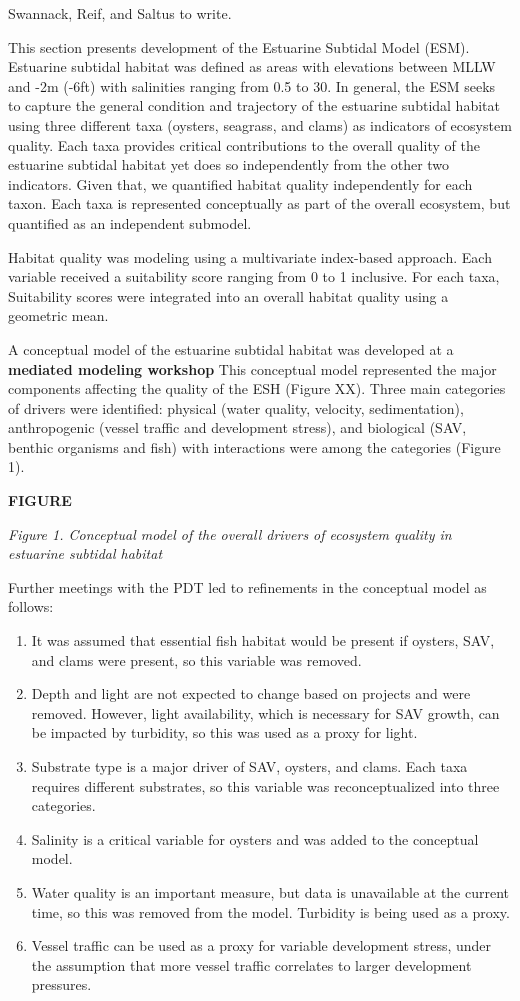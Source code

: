 \documentclass[
]{book}
\begin{document}
{Swannack, Reif, and Saltus to write.}

This section presents development of the Estuarine Subtidal Model (ESM). Estuarine subtidal habitat was defined as areas with elevations between MLLW and -2m (-6ft) with salinities ranging from 0.5 to 30. In general, the ESM seeks to capture the general condition and trajectory of the estuarine subtidal habitat using three different taxa (oysters, seagrass, and clams) as indicators of ecosystem quality. Each taxa provides critical contributions to the overall quality of the estuarine subtidal habitat yet does so independently from the other two indicators. Given that, we quantified habitat quality independently for each taxon. Each taxa is represented conceptually as part of the overall ecosystem, but quantified as an independent submodel.

Habitat quality was modeling using a multivariate index-based approach. Each variable received a suitability score ranging from 0 to 1 inclusive. For each taxa, Suitability scores were integrated into an overall habitat quality using a geometric mean.

A conceptual model of the estuarine subtidal habitat was developed at a \textbf{mediated modeling workshop} This conceptual model represented the major components affecting the quality of the ESH (Figure XX). Three main categories of drivers were identified: physical (water quality, velocity, sedimentation), anthropogenic (vessel traffic and development stress), and biological (SAV, benthic organisms and fish) with interactions were among the categories (Figure 1).

\textbf{FIGURE}

\emph{Figure 1. Conceptual model of the overall drivers of ecosystem quality in estuarine subtidal habitat}

Further meetings with the PDT led to refinements in the conceptual model as follows:

\begin{enumerate}
\def\labelenumi{\arabic{enumi}.}
\item
  It was assumed that essential fish habitat would be present if oysters, SAV, and clams were present, so this variable was removed.
\item
  Depth and light are not expected to change based on projects and were removed. However, light availability, which is necessary for SAV growth, can be impacted by turbidity, so this was used as a proxy for light.
\item
  Substrate type is a major driver of SAV, oysters, and clams. Each taxa requires different substrates, so this variable was reconceptualized into three categories.
\item
  Salinity is a critical variable for oysters and was added to the conceptual model.
\item
  Water quality is an important measure, but data is unavailable at the current time, so this was removed from the model. Turbidity is being used as a proxy.
\item
  Vessel traffic can be used as a proxy for variable development stress, under the assumption that more vessel traffic correlates to larger development pressures.
\end{enumerate}
\end{document}
